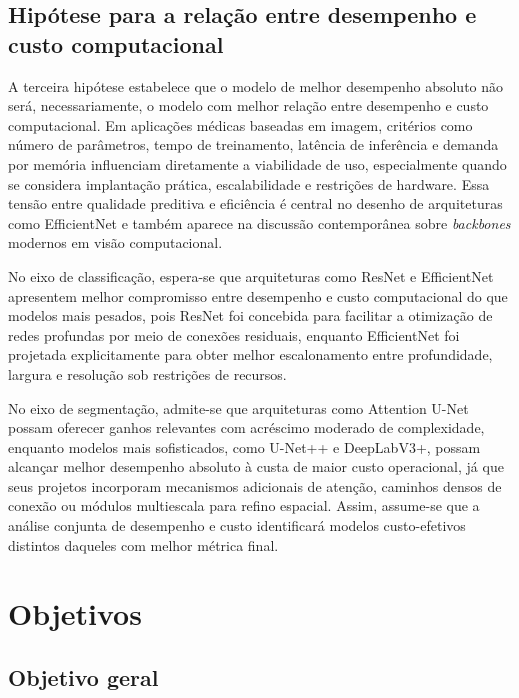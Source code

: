 \documentclass[tcc,capa]{texufpel}
\begin{document}
\subsection{Hipótese para a relação entre desempenho e custo computacional}

A terceira hipótese estabelece que o modelo de melhor desempenho absoluto não será, necessariamente, o modelo com melhor relação entre desempenho e custo computacional. Em aplicações médicas baseadas em imagem, critérios como número de parâmetros, tempo de treinamento, latência de inferência e demanda por memória influenciam diretamente a viabilidade de uso, especialmente quando se considera implantação prática, escalabilidade e restrições de hardware. Essa tensão entre qualidade preditiva e eficiência é central no desenho de arquiteturas como EfficientNet e também aparece na discussão contemporânea sobre \textit{backbones} modernos em visão computacional. \cite{Tan2019,Liu2022ConvNeXt,Barragan2021}

No eixo de classificação, espera-se que arquiteturas como ResNet e EfficientNet apresentem melhor compromisso entre desempenho e custo computacional do que modelos mais pesados, pois ResNet foi concebida para facilitar a otimização de redes profundas por meio de conexões residuais, enquanto EfficientNet foi projetada explicitamente para obter melhor escalonamento entre profundidade, largura e resolução sob restrições de recursos. \cite{He2016,Tan2019}

No eixo de segmentação, admite-se que arquiteturas como Attention U-Net possam oferecer ganhos relevantes com acréscimo moderado de complexidade, enquanto modelos mais sofisticados, como U-Net++ e DeepLabV3+, possam alcançar melhor desempenho absoluto à custa de maior custo operacional, já que seus projetos incorporam mecanismos adicionais de atenção, caminhos densos de conexão ou módulos multiescala para refino espacial. Assim, assume-se que a análise conjunta de desempenho e custo identificará modelos custo-efetivos distintos daqueles com melhor métrica final. \cite{Oktay2018,Zhou2018UNetPP,Chen2018DeepLabV3Plus,Renard2020}

\section{Objetivos}

\subsection{Objetivo geral}
\end{document}
